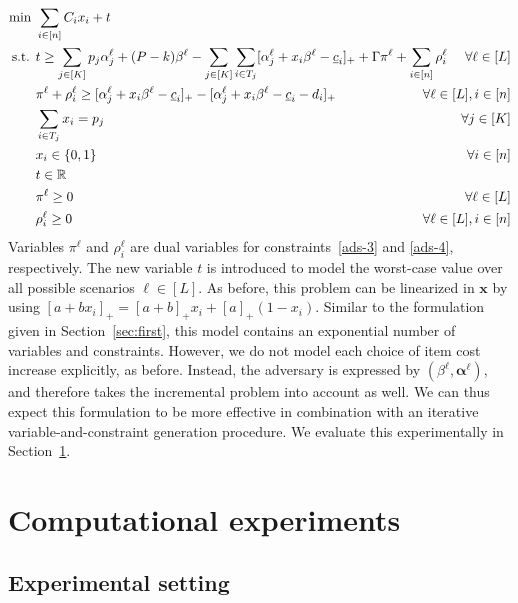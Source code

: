 \begin{subequations}
\label{eq:secmod}  
\begin{align}
\min\ & \sum_{i\in[n]} C_i x_i + t \label{secmod-1} \\
\text{s.t. } & t \ge \sum_{j\in[K]} p_j\alpha^{\ell}_j + (P-k)\beta^{\ell} - \sum_{j\in[K]} \sum_{i\in T_j} [\alpha^{\ell}_j + x_i\beta^{\ell} - \underline{c}_i]_+ + \Gamma\pi^{\ell} + \sum_{i\in[n]} \rho^{\ell}_i \hspace*{-10mm}& \forall {\ell}\in[L] \\
& \pi^{\ell} + \rho^{\ell}_i \ge [\alpha^{\ell}_j + x_i\beta^{\ell} - \underline{c}_i]_+ - [\alpha^{\ell}_j + x_i \beta^{\ell} - \underline{c}_i - d_i]_+ & \forall {\ell}\in[L], i\in[n] \\
& \sum_{i\in T_j} x_i = p_j & \forall j\in[K] \\
& x_i \in\{0,1\} & \forall i\in[n] \\
& t \in \rr \\
& \pi^{\ell} \ge 0 & \forall {\ell} \in[L] \\
& \rho^{\ell}_i \ge 0 & \forall {\ell} \in[L],i\in[n] \label{secmod-end}
\end{align}
\end{subequations}
Variables $\pi^{\ell}$ and $\rho^{\ell}_i$ are dual variables for constraints~\eqref{ads-3} and \eqref{ads-4}, respectively. The new variable $t$ is introduced to model the worst-case value over all possible scenarios $\ell \in[L]$. As before, this problem can be linearized in $\pmb{x}$ by using $[a+bx_i]_+ = [a+b]_+ x_i + [a]_+(1-x_i)$. Similar to the formulation given in Section~\ref{sec:first}, this model contains an exponential number of variables and constraints. However, we do not model each choice of item cost increase explicitly, as before. Instead, the adversary is expressed by $(\beta^{\ell},\pmb{\alpha}^{\ell})$, and therefore takes the incremental problem into account as well. We can thus expect this formulation to be more effective in combination with an iterative variable-and-constraint generation procedure. We evaluate this experimentally in Section~\ref{sec:experiments}.





\section{Computational experiments}
\label{sec:experiments}

\subsection{Experimental setting}

